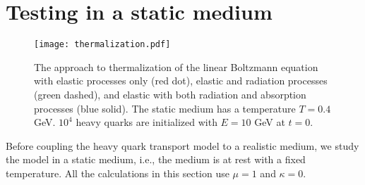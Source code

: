 \section{Testing in a static medium}
\begin{figure}
\texttt{[image: thermalization.pdf]}
\caption{The approach to thermalization of the linear Boltzmann equation with elastic processes only (red dot), elastic and radiation processes (green dashed), and elastic with both radiation and absorption processes (blue solid). The static medium has a temperature $T = 0.4$ GeV. $10^4$ heavy quarks are initialized with $E = 10$ GeV at $t = 0$.}\label{plots:thermalization}
\end{figure}

Before coupling the heavy quark transport model to a realistic medium, we study the model in a static medium, i.e., the medium is at rest with a fixed temperature.
All the calculations in this section use $\mu =1$ and $\kappa = 0$.

